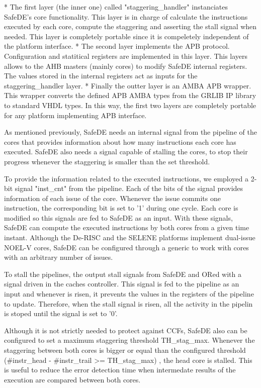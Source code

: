 * The first layer (the inner one) called "staggering\_handler" instanciates SafeDE's core functionality. This layer is in charge of calculate the instructions executed by each core, compute the staggering and asserting the stall signal when needed. This layer is completely portable since it is compeletely independent of the platform interface. 
* The second layer implements the APB protocol. Configuration and statitical registers are implemented in this layer. This layers allows to the AHB masters (mainly cores) to modify SafeDE internal registers. The values stored in the internal registers act as inputs for the staggering\_handler layer.
* Finally the outter layer is an AMBA APB wrapper. This wrapper converts the defined APB AMBA types from the GRLIB IP library to standard VHDL types. In this way, the first two layers are completely portable for any platform implementing APB interface.

As mentioned previously, SafeDE needs an internal signal from the pipeline of the cores that provides information about how many instructions each core has executed. SafeDE also needs a signal capable of stalling the cores, to stop their progress whenever the staggering is smaller than the set threshold. 

To provide the information related to the executed instructions, we employed a 2-bit signal "inst\_cnt" from the pipeline. Each of the bits of the signal provides information of each issue of the core. Whenever the issue commits one instruction, the corresponding bit is set to '1' during one cycle. Each core is modified so this signals are fed to SafeDE as an input. With these signals, SafeDE can compute the executed instructions by both cores from a given time instant. Although the De-RISC and the SELENE platforms implement dual-issue NOEL-V cores, SafeDE can be configured through a generic to work with cores with an arbitrary number of issues. 

To stall the pipelines, the output stall signals from SafeDE and ORed with a signal driven in the caches controller. This signal is fed to the pipeline as an input and whenever is risen, it prevents the values in the registers of the pipeline to update. Therefore, when the stall signal is risen, all the activity in the pipelin is stoped until the signal is set to '0'.

Although it is not strictly needed to protect against CCFs, SafeDE also can be configured to set a maximum staggering threshold TH\_stag\_max. Whenever the staggering between both cores is bigger or equal than the configured threshold (\#instr\_head - \#instr\_trail >= TH\_stag\_max) , the head core is stalled. This is useful to reduce the error detection time when intermedate results of the execution are compared between both cores.

